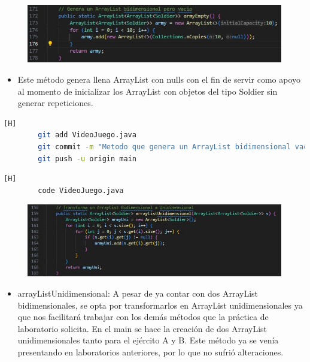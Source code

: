 \documentclass{article}
\begin{document}
	\begin{figure}[H]
		\centering
		\includegraphics[width=1\textwidth,keepaspectratio]{img/armyEmpty.jpg}
	\end{figure}
	
	
	\begin{itemize}	
		\item Este método genera llena ArrayList con nulls con el fin de servir como apoyo al momento de inicializar los ArrayList con objetos del tipo Soldier sin generar repeticiones.
	\end{itemize}
	

	
	\begin{lstlisting}[language=bash,caption={Commit: 55bd8cf312296a9a1727dc08824c0de7936e5060}][H]
		git add VideoJuego.java
		git commit -m "Metodo que genera un ArrayList bidimensional vacio"			
		git push -u origin main
	\end{lstlisting}	
	

	
	
	
	
	\begin{lstlisting}[language=bash,caption={Método que transforma ArrayList bidimensioanles en unidimensionales}][H]
		code VideoJuego.java
	\end{lstlisting}
	
	\begin{figure}[H]
		\centering
		\includegraphics[width=1\textwidth,keepaspectratio]{img/generateUni.jpg}
	\end{figure}
	
		
	\begin{itemize}	
		\item arrayListUnidimensional: A pesar de ya contar con dos ArrayList bidimensionales, se opta por transformarlos en ArrayList unidimensionales ya que nos facilitará trabajar con los demás métodos que la práctica de laboratorio solicita. En el main se hace la creación de dos ArrayList unidimensionales tanto para el ejército A y B. Este método ya se venía presentando en laboratorios anteriores, por lo que no sufrió alteraciones.
	\end{itemize}
	
\end{document}
